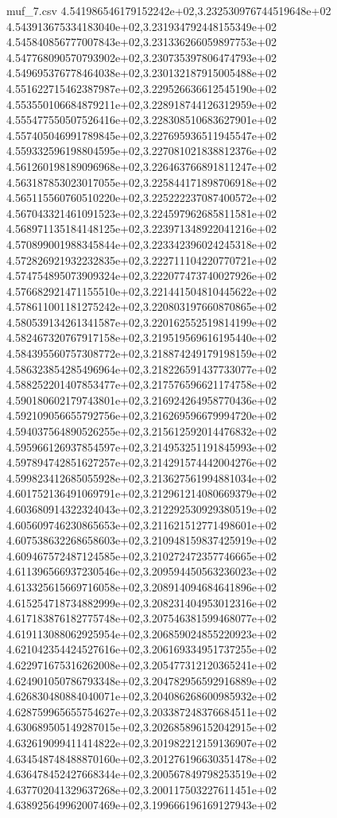 \begin{filecontents*}{muf_7.csv}
4.541986546179152242e+02,3.232530976744519648e+02
4.543913675334183040e+02,3.231934792448155349e+02
4.545840856777007843e+02,3.231336266059897753e+02
4.547768090570793902e+02,3.230735397806474793e+02
4.549695376778464038e+02,3.230132187915005488e+02
4.551622715462387987e+02,3.229526636612545190e+02
4.553550106684879211e+02,3.228918744126312959e+02
4.555477550507526416e+02,3.228308510683627901e+02
4.557405046991789845e+02,3.227695936511945547e+02
4.559332596198804595e+02,3.227081021838812376e+02
4.561260198189096968e+02,3.226463766891811247e+02
4.563187853023017055e+02,3.225844171898706918e+02
4.565115560760510220e+02,3.225222237087400572e+02
4.567043321461091523e+02,3.224597962685811581e+02
4.568971135184148125e+02,3.223971348922041216e+02
4.570899001988345844e+02,3.223342396024245318e+02
4.572826921932232835e+02,3.222711104220770721e+02
4.574754895073909324e+02,3.222077473740027926e+02
4.576682921471155510e+02,3.221441504810445622e+02
4.578611001181275242e+02,3.220803197660870865e+02
4.580539134261341587e+02,3.220162552519814199e+02
4.582467320767917158e+02,3.219519569616195440e+02
4.584395560757308772e+02,3.218874249179198159e+02
4.586323854285496964e+02,3.218226591437733077e+02
4.588252201407853477e+02,3.217576596621174758e+02
4.590180602179743801e+02,3.216924264958770436e+02
4.592109056655792756e+02,3.216269596679994720e+02
4.594037564890526255e+02,3.215612592014476832e+02
4.595966126937854597e+02,3.214953251191845993e+02
4.597894742851627257e+02,3.214291574442004276e+02
4.599823412685055928e+02,3.213627561994881034e+02
4.601752136491069791e+02,3.212961214080669379e+02
4.603680914322324043e+02,3.212292530929380519e+02
4.605609746230865653e+02,3.211621512771498601e+02
4.607538632268658603e+02,3.210948159837425919e+02
4.609467572487124585e+02,3.210272472357746665e+02
4.611396566937230546e+02,3.209594450563236023e+02
4.613325615669716058e+02,3.208914094684641896e+02
4.615254718734882999e+02,3.208231404953012316e+02
4.617183876182775748e+02,3.207546381599468077e+02
4.619113088062925954e+02,3.206859024855220923e+02
4.621042354424527616e+02,3.206169334951737255e+02
4.622971675316262008e+02,3.205477312120365241e+02
4.624901050786793348e+02,3.204782956592916889e+02
4.626830480884040071e+02,3.204086268600985932e+02
4.628759965655754627e+02,3.203387248376684511e+02
4.630689505149287015e+02,3.202685896152042915e+02
4.632619099411414822e+02,3.201982212159136907e+02
4.634548748488870160e+02,3.201276196630351478e+02
4.636478452427668344e+02,3.200567849798253519e+02
4.637702041329637268e+02,3.200117503227611451e+02
4.638925649962007469e+02,3.199666196169127943e+02

\end{filecontents*}
